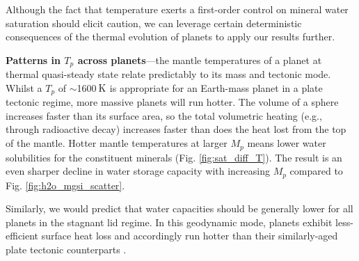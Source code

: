 \documentclass[fleqn,usenatbib]{mnras}
\begin{document}
Although the fact that temperature exerts a first-order control on mineral water saturation should elicit caution, we can leverage certain deterministic consequences of the thermal evolution of planets to apply our results further.



\medskip

\textbf{Patterns in $T_p$ across planets}---the mantle temperatures of a planet at thermal quasi-steady state relate predictably to its mass and tectonic mode. Whilst a $T_p$ of $\sim$1600$\,{\rm K}$ is appropriate for an Earth-mass planet in a plate tectonic regime, more massive planets will run hotter.
The volume of a sphere increases faster than its surface area, so the total volumetric heating (e.g., through radioactive decay) increases faster than does the heat lost from the top of the mantle. %
Hotter mantle temperatures at larger $M_p$ means lower water solubilities for the constituent minerals (Fig. \ref{fig:sat_diff_T}). The result is an even sharper decline in water storage capacity with increasing $M_p$ compared to Fig. \ref{fig:h2o_mgsi_scatter}.

Similarly, we would predict that water capacities should be generally lower for all planets in the stagnant lid regime. In this geodynamic mode, planets exhibit less-efficient surface heat loss and accordingly run hotter than their similarly-aged plate tectonic counterparts \citep[e.g.,][]{kite_geodynamics_2009}. 
\end{document}
